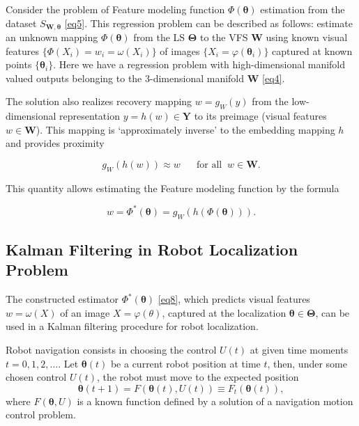 \documentclass[conference]{IEEEtran} %
\def\mbW{\mathbf{W}}
\def\mbTheta{{\bm\Theta}}
\def\mbtheta{{\bm\theta}}
\def\mbY{\mathbf{Y}}
\begin{document}
Consider the problem of Feature modeling function $\Phi(\mbtheta)$ estimation from the dataset $S_{\mathbf{W},\mbtheta}$ \eqref{eq5}. This regression problem can be described as follows: estimate an unknown mapping $\Phi(\mbtheta)$ from the LS $\mbTheta$ to the VFS $\mbW$ using known visual features $\{\Phi(X_i) = w_i = \omega(X_i)\}$ of images $\{X_i = \varphi(\mbtheta_i)\}$ captured at known points $\{\mbtheta_i\}$. Here we have a regression problem with high-dimensional manifold valued outputs belonging to the $3$-dimensional manifold $\mbW$ \eqref{eq4}.

The solution \cite{bib20} also realizes recovery mapping $w = g_W(y)$ from the low-dimensional representation $y = h(w) \in \mbY$ to its preimage (visual features $w \in \mbW$). This mapping is `approximately inverse' to the embedding mapping $h$ and provides proximity

\begin{equation}
\label{eq7}
	g_W(h(w)) \approx w \quad\,\,\,\,\text{for all} \;\; w \in \mbW.
\end{equation}

This quantity allows estimating the Feature modeling function by the formula

\begin{equation}
\label{eq8}
	w = \Phi^*(\mbtheta) = g_W(h(\Phi(\mbtheta))).	
\end{equation}

\subsection{Kalman Filtering in Robot Localization Problem}

The constructed estimator $\Phi^*(\mbtheta)$ \eqref{eq8}, which predicts  visual features $w = \omega(X)$ of an image $X = \varphi(\theta)$, captured at the localization $\mbtheta \in \mbTheta$, can be used in a Kalman filtering procedure \cite{bib5} for robot localization.

Robot navigation consists in choosing the control $U(t)$ at given time moments $t = 0, 1, 2, \dots$. Let $\mbtheta(t)$ be a current robot position at time $t$, then, under some chosen control $U(t)$, the robot must move to the expected position
\begin{equation}
\label{eq9}
	\mbtheta(t+1) = F(\mbtheta(t), U(t)) \equiv F_t(\mbtheta(t)),	
\end{equation}
where $F(\mbtheta, U)$ is a known function defined by a solution of a navigation motion control problem.
\end{document}
